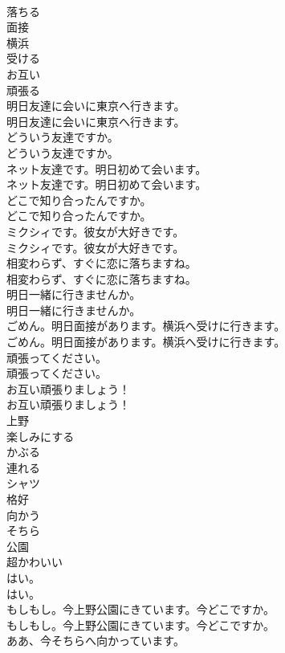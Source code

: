 \documentclass[8pt]{extreport}
\begin{document}
\begin{CJK}{UTF8}{min}
\\	落ちる
\\	面接
\\	横浜
\\	受ける
\\	お互い
\\	頑張る
\\	明日友達に会いに東京へ行きます。	
\\	明日友達に会いに東京へ行きます。 
\\	どういう友達ですか。	
\\	どういう友達ですか。 
\\	ネット友達です。明日初めて会います。	
\\	ネット友達です。明日初めて会います。 
\\	どこで知り合ったんですか。	
\\	どこで知り合ったんですか。 
\\	ミクシィです。彼女が大好きです。	
\\	ミクシィです。彼女が大好きです。 
\\	相変わらず、すぐに恋に落ちますね。	
\\	相変わらず、すぐに恋に落ちますね。 
\\	明日一緒に行きませんか。	
\\	明日一緒に行きませんか。 
\\	ごめん。明日面接があります。横浜へ受けに行きます。	
\\	ごめん。明日面接があります。横浜へ受けに行きます。 
\\	頑張ってください。	
\\	頑張ってください。 
\\	お互い頑張りましょう！	
\\	お互い頑張りましょう！ 
\\	上野
\\	楽しみにする
\\	かぶる
\\	連れる
\\	シャツ
\\	格好
\\	向かう
\\	そちら
\\	公園
\\	超かわいい
\\	はい。	
\\	はい。 
\\	もしもし。今上野公園にきています。今どこですか。	
\\	もしもし。今上野公園にきています。今どこですか。 
\\	ああ、今そちらへ向かっています。	

\end{CJK}
\end{document}
